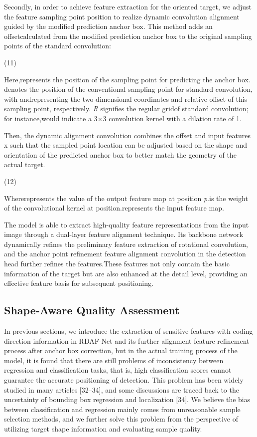 \documentclass[journal]{IEEEtran}
\begin{document}
	Secondly, in order to achieve feature extraction for the oriented target, we adjust the feature sampling point position to realize dynamic convolution alignment guided by the modified prediction anchor box. This method adds an offsetcalculated from the modified prediction anchor box to the original sampling points of the standard convolution:

	(11)

Here,represents the position of the sampling point for predicting the anchor box. denotes the position of the conventional sampling point for standard convolution, with andrepresenting the two-dimensional coordinates and relative offset of this sampling point, respectively. \textit{R} signifies the regular gridof standard convolution; for instance,would indicate a 3×3 convolution kernel with a dilation rate of 1.

	Then, the dynamic alignment convolution combines the offset and input features x such that the sampled point location can be adjusted based on the shape and orientation of the predicted anchor box to better match the geometry of the actual target.

	(12)

Whererepresents the value of the output feature map at position \textit{p}.is the weight of the convolutional kernel at position.represents the input feature map.

The model is able to extract high-quality feature representations from the input image through a dual-layer feature alignment technique. Its backbone network dynamically refines the preliminary feature extraction of rotational convolution, and the anchor point refinement feature alignment convolution in the detection head further refines the features.These features not only contain the basic information of the target but are also enhanced at the detail level, providing an effective feature basis for subsequent positioning.

\subsection{ Shape-Aware Quality Assessment }

In previous sections, we introduce the extraction of sensitive features with coding direction information in RDAF-Net and its further alignment feature refinement process after anchor box correction, but in the actual training process of the model, it is found that there are still problems of inconsistency between regression and classification tasks, that is, high classification scores cannot guarantee the accurate positioning of detection. This problem has been widely studied in many articles [32–34], and some discussions are traced back to the uncertainty of bounding box regression and localization [34]. We believe the bias between classification and regression mainly comes from unreasonable sample selection methods, and we further solve this problem from the perspective of utilizing target shape information and evaluating sample quality.
\end{document}
